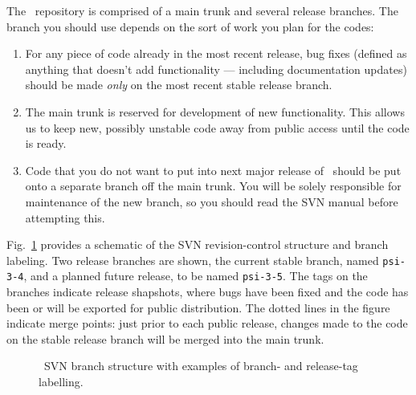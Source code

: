 The \PSIthree\ repository is comprised of a main trunk and several
release branches.  The branch you should use depends on the sort of 
work you plan for the codes:
\begin{enumerate}
\item For any piece of code already in the most recent release, bug
  fixes (defined as anything that doesn't add functionality ---
  including documentation updates) should be made {\em only} on the
  most recent stable release branch.
\item The main trunk is reserved for development of new functionality.
  This allows us to keep new, possibly unstable code away from public
  access until the code is ready.
\item Code that you do not want to put into next major release of
  \PSIthree\ should be put onto a separate branch off the main
  trunk. You will be solely responsible for maintenance of the new
  branch, so you should read the SVN manual before attempting this.
\end{enumerate}

\noindent Fig.~\ref{Fig:svn} provides a schematic of the SVN revision-control
structure and branch labeling.  Two release branches are shown, the current
stable branch, named {\tt psi-3-4}, and a planned future release, to be named
{\tt psi-3-5}.  The tags on the branches indicate release shapshots, where
bugs have been fixed and the code has been or will be exported for public
distribution.  The dotted lines in the figure indicate merge points: just
prior to each public release, changes made to the code on the stable release
branch will be merged into the main trunk.

\begin{figure}[h]
\begin{center}
\end{center}
\caption{\PSIthree\ SVN branch structure with examples of branch- and
release-tag labelling.}
\label{Fig:svn}
\end{figure}

